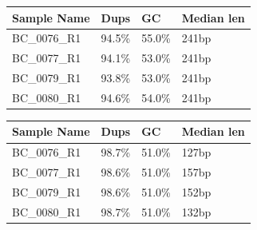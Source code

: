 \documentclass[
  11pt,
  a4paper,
]{report}
\begin{document}
\begin{table}

\caption{\label{tbl-example}Before trimming}

\begin{minipage}{\linewidth}

\begin{longtable}[]{@{}llll@{}}
\toprule\noalign{}
Sample Name & Dups & GC & Median len \\
\midrule\noalign{}
\endhead
\bottomrule\noalign{}
\endlastfoot
BC\_0076\_R1 & 94.5\% & 55.0\% & 241bp \\
BC\_0077\_R1 & 94.1\% & 53.0\% & 241bp \\
BC\_0079\_R1 & 93.8\% & 53.0\% & 241bp \\
BC\_0080\_R1 & 94.6\% & 54.0\% & 241bp \\
\end{longtable}

\end{minipage}%

\end{table}%

\begin{table}

\caption{\label{tbl-example}After trimming}

\begin{minipage}{\linewidth}

\begin{longtable}[]{@{}llll@{}}
\toprule\noalign{}
Sample Name & Dups & GC & Median len \\
\midrule\noalign{}
\endhead
\bottomrule\noalign{}
\endlastfoot
BC\_0076\_R1 & 98.7\% & 51.0\% & 127bp \\
BC\_0077\_R1 & 98.6\% & 51.0\% & 157bp \\
BC\_0079\_R1 & 98.6\% & 51.0\% & 152bp \\
BC\_0080\_R1 & 98.7\% & 51.0\% & 132bp \\
\end{longtable}

\end{minipage}%

\end{table}%

\clearpage
\thispagestyle{empty}
\vspace*{\fill}
\vspace*{\fill}
\clearpage
\end{document}
